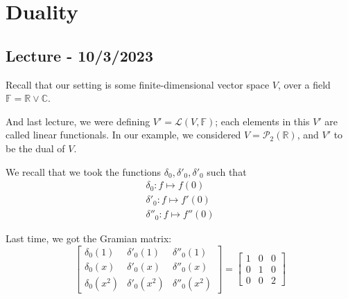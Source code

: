 \documentclass[openany]{book}
\newcommand{\CC}{\mathbb{C}}
\newcommand{\RR}{\mathbb{R}}
\begin{document}
\chapter{Duality}
\section{Lecture - 10/3/2023}
Recall that our setting is some finite-dimensional vector space $V$, over a field $\mathbb{F} = \RR \lor \CC$.

And last lecture, we were defining $V' = \mathcal L(V,\mathbb{F})$; each elements in this $V'$ are called linear functionals. In our example, we considered $V = \mathscr P_{2}(\RR)$, and $V'$ to be the dual of $V$.

We recall that we took the functions $\delta_0, \delta'_0, \delta'_0$ such that
\begin{align*}
	\delta_0 : f \mapsto f(0) \\
	\delta'_{0} : f \mapsto f'(0) \\
	\delta''_{0}: f\mapsto f''(0)
\end{align*}

Last time, we got the Gramian matrix:
\begin{equation*}
	\begin{bmatrix}
		\delta_0(1) & \delta'_{0}(1) & \delta''_{0}(1) \\
		\delta_0(x) & \delta'_0(x) & \delta''_{0}(x) \\
		\delta_0(x^{2}) & \delta'_{0}(x^{2}) & \delta''_{0}(x^{2})
	\end{bmatrix}
	=
	\begin{bmatrix}
		1 & 0 & 0 \\ 0 & 1 & 0 \\ 0 & 0 & 2
	\end{bmatrix}
\end{equation*}
\end{document}
